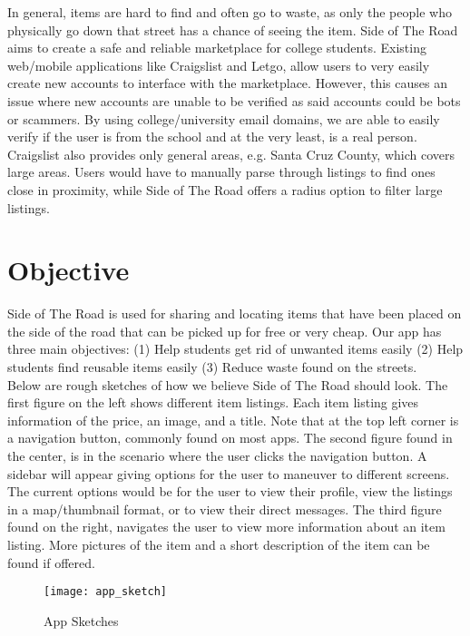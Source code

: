 \documentclass[sigconf]{acmart}
\begin{document}
\noindent
In general, items are hard to find and often go to waste, as only the people who physically go down that street has a chance of seeing the item. Side of The Road aims to create a safe and reliable marketplace for college students. Existing  web/mobile applications like Craigslist and Letgo, allow users to very easily create new accounts to interface with the marketplace. However, this causes an issue where new accounts are unable to be verified as said accounts could be bots or scammers. By using college/university email domains, we are able to easily verify if the user is from the school and at the very least, is a real person. Craigslist also provides only general areas, e.g. Santa Cruz County, which covers large areas. Users would have to manually parse through listings to find ones close in proximity, while Side of The Road offers a radius option to filter large listings.


\section{Objective}
Side of The Road is used for sharing and locating items that have been placed on the side of the road that can be picked up for free or very cheap. Our app has three main objectives: (1) Help students get rid of unwanted items easily (2) Help students find reusable items easily (3) Reduce waste found on the streets. \\

\noindent
Below are rough sketches of how we believe Side of The Road should look. The first figure on the left shows different item listings. Each item listing gives information of the price, an image, and a title. Note that at the top left corner is a navigation button, commonly found on most apps. The second figure found in the center, is in the scenario where the user clicks the navigation button. A sidebar will appear giving options for the user to maneuver to different screens. The current options would be for the user to view their profile, view the listings in a map/thumbnail format, or to view their direct messages. The third figure found on the right, navigates the user to view more information about an item listing. More pictures of the item and a short description of the item can be found if offered.

\begin{figure}[H]
	\texttt{[image: app\_sketch]}
	\caption{App Sketches}
	\label{}
\end{figure}
\end{document}
